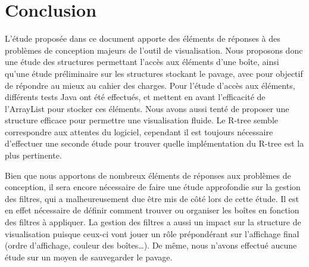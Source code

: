 \chapter{Conclusion}
L'étude proposée dans ce document apporte des éléments de réponses à des problèmes de conception majeurs de l'outil de visualisation. Nous proposons donc une étude des structures permettant l'accès aux éléments d'une boîte, ainsi qu'une étude préliminaire sur les structures stockant le pavage, avec pour objectif de répondre au mieux au cahier des charges. Pour l'étude d'accès aux éléments, différents tests Java ont été effectués, et mettent en avant l'efficacité de l'ArrayList pour stocker ces éléments. Nous avons aussi tenté de proposer une structure efficace pour permettre une visualisation fluide. Le R-tree semble correspondre aux attentes du logiciel, cependant il est toujours nécessaire d'effectuer une seconde étude pour trouver quelle implémentation du R-tree est la plus pertinente.

Bien que nous apportons de nombreux éléments de réponses aux problèmes de conception, il sera encore nécessaire de faire une étude approfondie sur la gestion des filtres, qui a malheureusement due être mis de côté lors de cette étude. Il est en effet nécessaire de définir comment trouver ou organiser les boîtes en fonction des filtres à appliquer. La gestion des filtres a aussi un impact sur la structure de visualisation puisque ceux-ci vont jouer un rôle prépondérant sur l'affichage final (ordre d'affichage, couleur des boîtes\dots). De même, nous n'avons effectué aucune étude sur un moyen de sauvegarder le pavage.
